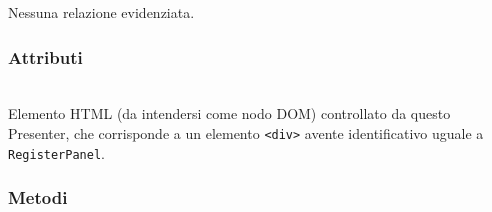 Nessuna relazione evidenziata.

\subsubsection*{Attributi}
\begin{description}
  \item{}\\
  Elemento HTML (da intendersi come nodo DOM) controllato da questo Presenter, che corrisponde a un elemento \verb'<div>' avente identificativo uguale a \verb'RegisterPanel'.
\end{description}

\subsubsection*{Metodi}
